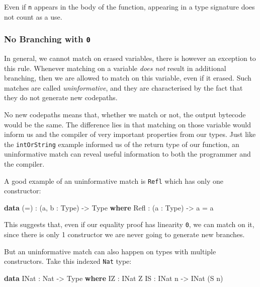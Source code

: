\documentclass[
]{article}
\newenvironment{Shaded}{}{}
\newcommand{\DataTypeTok}[1]{\textcolor[rgb]{0.56,0.13,0.00}{#1}}
\newcommand{\KeywordTok}[1]{\textcolor[rgb]{0.00,0.44,0.13}{\textbf{#1}}}
\newcommand{\NormalTok}[1]{#1}
\newcommand{\OperatorTok}[1]{\textcolor[rgb]{0.40,0.40,0.40}{#1}}
\newcommand{\OtherTok}[1]{\textcolor[rgb]{0.00,0.44,0.13}{#1}}
\begin{document}
Even if \texttt{n} appears in the body of the function, appearing in a
type signature does not count as a use.

\hypertarget{no-branching-with-0}{%
\subsubsection{\texorpdfstring{No Branching with
\texttt{0}}{No Branching with 0}}\label{no-branching-with-0}}

In general, we cannot match on erased variables, there is however an
exception to this rule. Whenever matching on a variable \emph{does not}
result in additional branching, then we are allowed to match on this
variable, even if it erased. Such matches are called
\emph{uninformative}, and they are characterised by the fact that they
do not generate new codepaths.

No new codepaths means that, whether we match or not, the output
bytecode would be the same. The difference lies in that matching on
those variable would inform us and the compiler of very important
properties from our types. Just like the \texttt{intOrString} example
informed us of the return type of our function, an uninformative match
can reveal useful information to both the programmer and the compiler.

A good example of an uninformative match is \texttt{Refl} which has only
one constructor:

\begin{Shaded}
\begin{Highlighting}[]
\KeywordTok{data}\NormalTok{ (}\OtherTok{=}\NormalTok{) }\OperatorTok{:}\NormalTok{ (a, b }\OperatorTok{:} \DataTypeTok{Type}\NormalTok{) }\OtherTok{{-}\textgreater{}} \DataTypeTok{Type} \KeywordTok{where}
  \DataTypeTok{Refl} \OperatorTok{:}\NormalTok{ (a }\OperatorTok{:} \DataTypeTok{Type}\NormalTok{) }\OtherTok{{-}\textgreater{}}\NormalTok{ a }\OtherTok{=}\NormalTok{ a}
\end{Highlighting}
\end{Shaded}

This suggests that, even if our equality proof has linearity \texttt{0},
we can match on it, since there is only 1 constructor we are never going
to generate new branches.

But an uninformative match can also happen on types with multiple
constructors. Take this indexed \texttt{Nat} type:

\begin{Shaded}
\begin{Highlighting}[]
\KeywordTok{data} \DataTypeTok{INat} \OperatorTok{:} \DataTypeTok{Nat} \OtherTok{{-}\textgreater{}} \DataTypeTok{Type} \KeywordTok{where}
  \DataTypeTok{IZ} \OperatorTok{:} \DataTypeTok{INat} \DataTypeTok{Z}
  \DataTypeTok{IS} \OperatorTok{:} \DataTypeTok{INat}\NormalTok{ n }\OtherTok{{-}\textgreater{}} \DataTypeTok{INat}\NormalTok{ (}\DataTypeTok{S}\NormalTok{ n)}
\end{Highlighting}
\end{Shaded}
\end{document}
